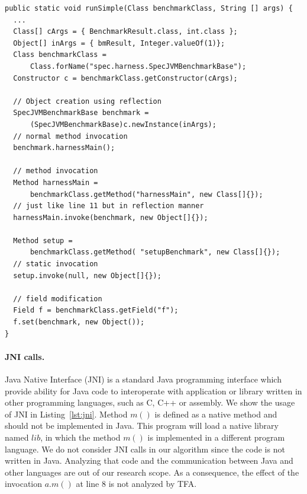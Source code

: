 \documentclass{fac}
\begin{document}
\begin{lstlisting}[caption={Example code for reflection},label={lst:reflection}]
public static void runSimple(Class benchmarkClass, String [] args) {
  ...
  Class[] cArgs = { BenchmarkResult.class, int.class };
  Object[] inArgs = { bmResult, Integer.valueOf(1)};
  Class benchmarkClass =
      Class.forName("spec.harness.SpecJVMBenchmarkBase");
  Constructor c = benchmarkClass.getConstructor(cArgs);

  // Object creation using reflection
  SpecJVMBenchmarkBase benchmark =
      (SpecJVMBenchmarkBase)c.newInstance(inArgs);
  // normal method invocation
  benchmark.harnessMain();

  // method invocation
  Method harnessMain =
      benchmarkClass.getMethod("harnessMain", new Class[]{});
  // just like line 11 but in reflection manner
  harnessMain.invoke(benchmark, new Object[]{});

  Method setup =
      benchmarkClass.getMethod( "setupBenchmark", new Class[]{});
  // static invocation
  setup.invoke(null, new Object[]{});

  // field modification
  Field f = benchmarkClass.getField("f");
  f.set(benchmark, new Object());
}
\end{lstlisting}

\paragraph{JNI calls.} Java Native Interface (JNI) is a standard Java programming interface which provide ability for Java code to interoperate with application or library written in other programming languages, such as C, C++ or assembly. We show the usage of JNI in Listing~\ref{lst:jni}. Method $m()$ is defined as a native method and should not be implemented in Java. This program will load a native library named $lib$, in which the method $m()$ is implemented in a different program language. We do not consider JNI calls in our algorithm since the code is not written in Java. Analyzing that code and the communication between Java and other languages are out of our research scope. As a consequence, the effect of the invocation $a.m()$ at line $8$ is not analyzed by TFA.
\end{document}
